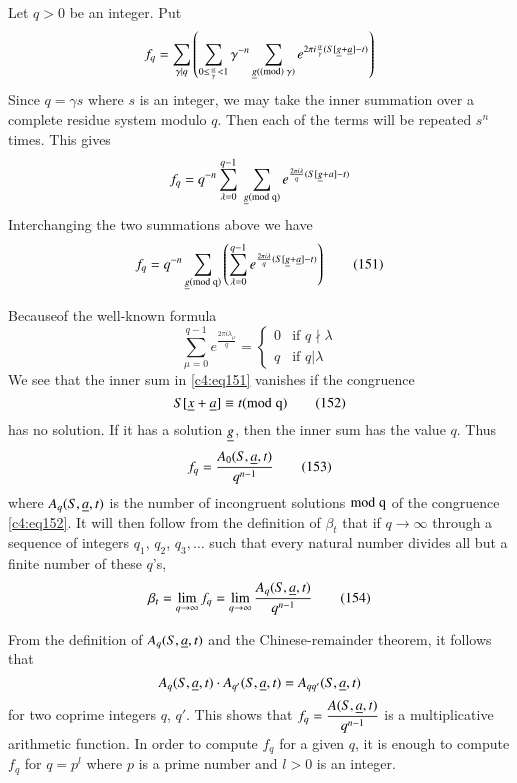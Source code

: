 Let $q>0$ be an integer. Put
$$
f_{q}=\sum_{\gamma|q}\left(\sum_{0\leq
  \frac{\alpha}{\gamma}<1}\gamma^{-n}\sum_{\underline{g}(\rm(mod) \; \gamma)}e^{2\pi
  i\frac{\alpha}{\gamma}(S[\underline{g}+\underline{a}]-t)}\right)
$$
Since $q=\gamma s$ where $s$ is an integer, we may take the inner
summation over a complete residue system modulo $q$. Then each of the
terms will be repeated $s^{n}$ times. This gives
$$
f_{q}=q^{-n}\sum^{q-1}_{\lambda=0} \; \sum_{\underline{g} (\rm{mod} \; q)}e^{\frac{2\pi
    i\lambda}{q}(S[\underline{g}+a]-t)} 
$$
Interchanging the two summations above we have
\begin{equation*}
f_{q}=q^{-n}\sum_{\underline{g} (\rm{mod} \; q)}\left(\sum^{q-1}_{\lambda=0}
e^{\frac{2\pi i\lambda}{q}(S[\underline{g}+\underline{a}]-t)}\right)\tag{151}\label{c4:eq151}
\end{equation*} 

Because\pageoriginale of the well-known formula
$$
\sum^{q-1}_{\mu=0}e^{\frac{2\pi i\lambda_{\mu}}{q}}=
\begin{cases}
0 & \text{if } q \nmid \lambda\\
q & \text{if } q|\lambda
\end{cases}
$$
We see that the inner sum in \eqref{c4:eq151} vanishes if the congruence
\begin{equation*}
S[\underline{x}+\underline{a}]\equiv t (\rm{mod} \; q)\tag{152}\label{c4:eq152}
\end{equation*}
has no solution. If it has a solution $\underline{g}$, then the inner sum has
the value $q$. Thus
\begin{equation*}
f_{q}=\frac{A_{0}(S,\underline{a},t)}{q^{n-1}}\tag{153}\label{c4:eq153}
\end{equation*}
where $A_{q}(S,\underline{a},t)$ is the number of incongruent solutions
$\rm{mod} \;
q$ of the congruence \eqref{c4:eq152}. It will then follow from the
definition of $\beta_{t}$ that if $q\to \infty$ through a sequence of
integers $q_{1}$, $q_{2}$, $q_{3},\ldots$ such that every natural
number divides all but a finite number of these $q$'s,
\begin{equation*}
\beta_{t}=\lim\limits_{q\to   \infty}f_{q}
 =\lim\limits_{q\to\infty}\frac{A_{q}(S,\underline{a},t)}{q^{n-1}}\tag{154}\label{c4:eq154}  
\end{equation*}

From the definition of $A_{q}(S,\underline{a},t)$ and the Chinese-remainder
theorem, it follows that
$$
A_{q}(S,\underline{a},t)\cdot A_{q'}(S,\underline{a},t)=A_{qq'}(S,\underline{a},t)
$$
for two coprime integers $q$, $q'$. This shows that
$f_{q}=\dfrac{A(S,\underline{a},t)}{q^{n-1}}$ is a multiplicative arithmetic
function. In order to compute $f_{q}$ for a given $q$, it is enough to
compute $f_{q}$ for $q=p^{l}$ where $p$ is a prime number and $l>0$ is
an integer.

